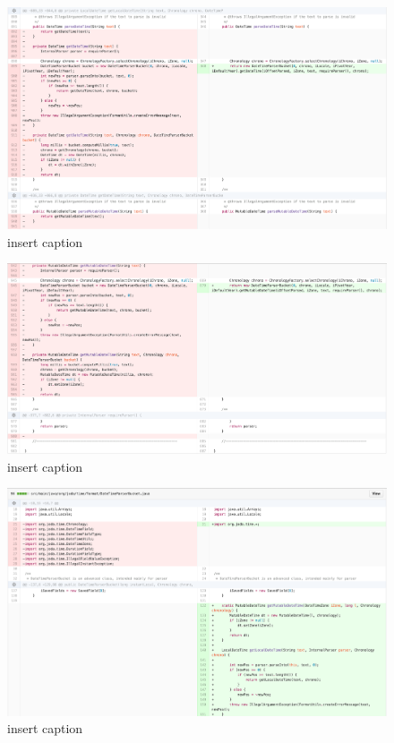 \begin{figure}[H]
	\centering
	\includegraphics[width=\linewidth]{code48}
	\caption{insert caption}
\end{figure}
\begin{figure}[H]
	\centering
	\includegraphics[width=\linewidth]{code49}
	\caption{insert caption}
\end{figure}
\begin{figure}[H]
	\centering
	\includegraphics[width=\linewidth]{code50}
	\caption{insert caption}
\end{figure}
